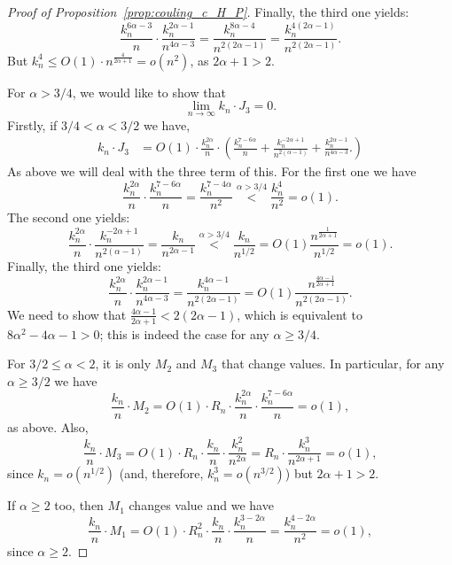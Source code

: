 \begin{proof}[Proof of Proposition~\ref{prop:couling_c_H_P}]
 Finally, the third one yields: 
$$ \frac{k_n^{6\alpha -3}}{n} \cdot \frac{k_n^{2\alpha -1}}{n^{4\alpha - 3}}  
= \frac{k_n^{8\alpha -4}}{n^{2(2\alpha -1)}} = \frac{k_n^{4(2\alpha -1)}}{n^{2(2\alpha-1)}}.$$
But $k_n^4 \leq O(1)\cdot n^{\frac{4}{2\alpha+1}} = o(n^2)$, as $2\alpha +1 >2$.
 
For $\alpha >3/4$, we would like to show that 
\begin{equation} \label{eq:int3_to_prove_II}
\lim_{n \to \infty} k_n \cdot J_3 = 0. 
\end{equation}
Firstly, if $3/4 < \alpha < 3/2$ we have, 
\begin{align*} 
 k_n \cdot J_3 &= O(1) \cdot  
 \frac{k_n^{2\alpha}}{n} \cdot 
\left( 
\frac{k_n^{7-6\alpha}}{n} + \frac{k_n^{-2\alpha +1}}{n^{2(\alpha-1)}} 
+\frac{k_n^{2\alpha -1}}{n^{4\alpha - 3}}.
\right) 
\end{align*}
As above we will deal with the three term of this. 
For the first one we have 
$$  \frac{k_n^{2\alpha}}{n} \cdot 
\frac{k_n^{7-6\alpha}}{n}  = \frac{k_n^{7-4\alpha }}{n^2} \stackrel{\alpha >3/4}{<}  
\frac{k_n^{4}}{n^2} =o(1). 
$$
The second one yields: 
$$\frac{k_n^{2\alpha}}{n} \cdot 
\frac{k_n^{-2\alpha +1}}{n^{2(\alpha-1)}} =
\frac{k_n}{n^{2\alpha-1}} \stackrel{\alpha > 3/4}{<} \frac{k_n}{n^{1/2}} = O(1) 
\frac{n^{\frac{1}{2\alpha+1}}}{n^{1/2}} =o(1).$$
Finally, the third one yields: 
$$  \frac{k_n^{2\alpha}}{n} \cdot \frac{k_n^{2\alpha -1}}{n^{4\alpha - 3}}
= \frac{k_n^{4\alpha -1}}{n^{2(2\alpha -1)}}=
O(1) \frac{n^{\frac{4\alpha-1}{2\alpha+1}}}{n^{2(2\alpha -1)}}.$$
We need to show that $\frac{4\alpha-1}{2\alpha+1}< 2(2\alpha -1)$, which is 
equivalent to $8\alpha^2 - 4 \alpha -1>0$; this is indeed the case for any $\alpha \geq 3/4$. 

 
 For $3/2 \leq \alpha <2$, it is only $M_2$ and $M_3$ that change values. 
 In particular, for any $\alpha \geq 3/2$ we have 
 $$\frac{k_n}{n} \cdot M_2 =O(1)\cdot R_n \cdot \frac{k_n^{2\alpha}}{n} \cdot 
\frac{k_n^{7-6\alpha}}{n} =o(1),$$
as above. 
Also, 
$$ \frac{k_n}{n} \cdot M_3 = O(1)\cdot
R_n \cdot \frac{k_n}{n} \cdot \frac{k_n^{2}}{n^{2\alpha}}
= R_n\cdot  \frac{k_n^{3}}{n^{2\alpha +1}} = o(1),
$$
since $k_n = o(n^{1/2})$ (and, therefore, $k_n^3 = o(n^{3/2})$) but $2\alpha +1 >2$. 

If $\alpha \geq 2$ too, then $M_1$ changes value and we have 
$$\frac{k_n}{n} \cdot M_1 =O(1) \cdot R_n^2 \cdot 
\frac{k_n}{n}  \cdot \frac{k_n^{3-2\alpha}}{n} = \frac{k_n^{4 - 2\alpha}}{n^2}= o(1),$$ 
since $\alpha \geq 2$. 
 

\end{proof}
